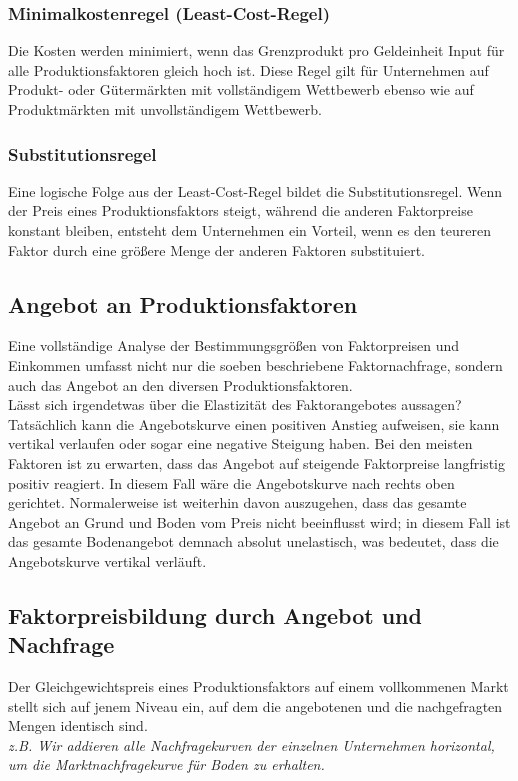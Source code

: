 \documentclass[10pt]{scrartcl}
\begin{document}
\subsubsection{Minimalkostenregel (Least-Cost-Regel)}
Die Kosten werden minimiert, wenn das Grenzprodukt pro Geldeinheit Input für alle Produktionsfaktoren gleich hoch ist. Diese Regel gilt für Unternehmen auf Produkt- oder Gütermärkten mit vollständigem Wettbewerb ebenso wie auf Produktmärkten mit unvollständigem Wettbewerb.

\subsubsection{Substitutionsregel}
Eine logische Folge aus
der Least-Cost-Regel bildet die Substitutionsregel. Wenn der Preis eines Produktionsfaktors steigt, während die anderen Faktorpreise konstant bleiben, entsteht dem Unternehmen ein Vorteil, wenn es den teureren Faktor durch eine größere Menge der anderen Faktoren substituiert. 

\subsection{Angebot an Produktionsfaktoren}
Eine vollständige Analyse der Bestimmungsgrößen von Faktorpreisen und Einkommen umfasst nicht nur die soeben beschriebene Faktornachfrage, sondern auch das Angebot an den  diversen Produktionsfaktoren.\\
Lässt sich irgendetwas über die Elastizität des Faktorangebotes aussagen? Tatsächlich kann die Angebotskurve einen positiven Anstieg aufweisen, sie kann vertikal verlaufen oder sogar eine negative Steigung haben. Bei den meisten Faktoren ist zu erwarten, dass das Angebot auf steigende Faktorpreise langfristig positiv reagiert. In diesem Fall wäre die Angebotskurve nach rechts oben gerichtet. Normalerweise ist weiterhin davon auszugehen, dass das gesamte Angebot an Grund und Boden vom Preis nicht beeinflusst wird; in diesem Fall ist das gesamte Bodenangebot demnach absolut unelastisch, was bedeutet, dass die Angebotskurve vertikal verläuft.  
\subsection{Faktorpreisbildung durch Angebot und Nachfrage}
Der Gleichgewichtspreis eines Produktionsfaktors auf einem vollkommenen Markt stellt sich auf jenem Niveau ein, auf dem die angebotenen und die nachgefragten Mengen identisch sind.\\
{\it z.B. Wir addieren alle Nachfragekurven der einzelnen Unternehmen horizontal, um die Marktnachfragekurve für Boden zu erhalten.}\\
\end{document}
